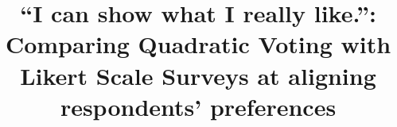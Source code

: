 \documentclass[format=acmsmall, natbib=false, anonymous=true]{acmart}
\begin{document}
\title[QV vs Likert]{``\textellipsis I can show what I really like.'': 
Comparing Quadratic Voting with Likert Scale Surveys at aligning respondents' preferences}










\end{document}
